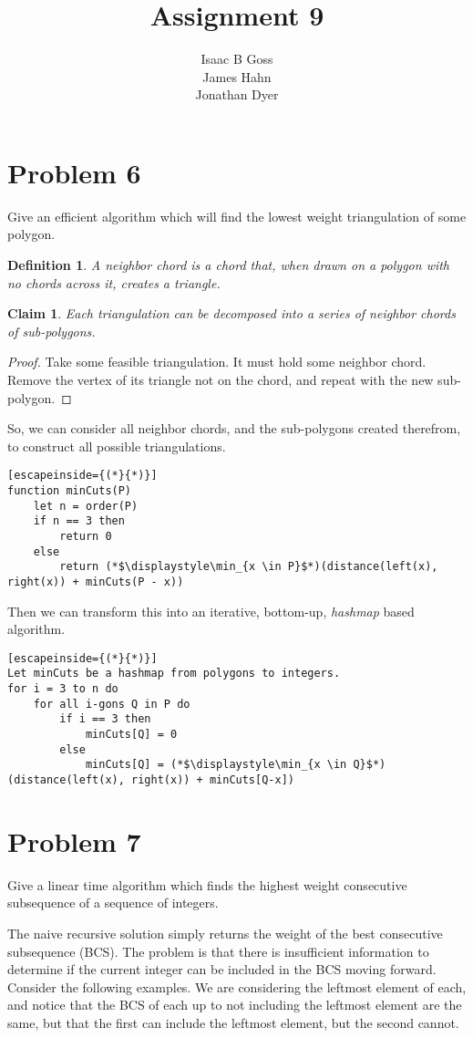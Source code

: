 \documentclass{article}
\author{Isaac B Goss\\ James Hahn\\ Jonathan Dyer}
\title{Assignment 9}
\newtheorem{thm}{Claim}
\newtheorem{defn}{Definition}
\providecommand{\prob}[1]{\section*{Problem #1}}
\begin{document}
\maketitle

    \prob{6}
    Give an efficient algorithm which will find the lowest weight triangulation of some polygon.
    \begin{defn}
        A neighbor chord is a chord that, when drawn on a polygon with no chords across it, creates a triangle.
    \end{defn}

    \begin{thm}
        Each triangulation can be decomposed into a series of neighbor chords of sub-polygons.
    \end{thm}
    \begin{proof}
        Take some feasible triangulation.
        It must hold some neighbor chord.
        Remove the vertex of its triangle not on the chord, and repeat with the new sub-polygon. 
    \end{proof}
    
    So, we can consider all neighbor chords, and the sub-polygons created therefrom, to construct all possible triangulations.
    
    \begin{lstlisting}[escapeinside={(*}{*)}]
function minCuts(P)
    let n = order(P)
    if n == 3 then
        return 0
    else
        return (*$\displaystyle\min_{x \in P}$*)(distance(left(x), right(x)) + minCuts(P - x))
    \end{lstlisting}
    
    Then we can transform this into an iterative, bottom-up, \emph{hashmap} based algorithm.
    
    \begin{lstlisting}[escapeinside={(*}{*)}]
Let minCuts be a hashmap from polygons to integers.
for i = 3 to n do
    for all i-gons Q in P do
        if i == 3 then
            minCuts[Q] = 0
        else
            minCuts[Q] = (*$\displaystyle\min_{x \in Q}$*)(distance(left(x), right(x)) + minCuts[Q-x])
    \end{lstlisting}
    
    \pagebreak
    \prob{7}
    Give a linear time algorithm which finds the highest weight consecutive subsequence of a sequence of integers.
    
    The naive recursive solution simply returns the weight of the best consecutive subsequence (BCS).
    The problem is that there is insufficient information to determine if the current integer can be included in the BCS moving forward.
    Consider the following examples. We are considering the leftmost element of each, and notice that the BCS of each up to not including the leftmost element are the same, but that the first can include the leftmost element, but the second cannot.
    
\end{document}
